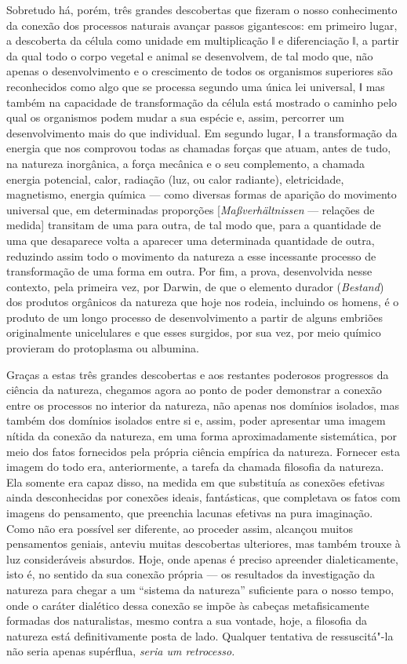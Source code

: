 Sobretudo há, porém, três grandes descobertas que fizeram o nosso
conhecimento da conexão dos processos naturais avançar passos
gigantescos: em primeiro lugar, a descoberta da célula como unidade em
multiplicação ǁ e diferenciação ǁ, a partir da qual todo o corpo vegetal
e animal se desenvolvem, de tal modo que, não apenas o desenvolvimento e
o crescimento de todos os organismos superiores são reconhecidos como
algo que se processa segundo uma única lei universal, ǁ mas também na
capacidade de transformação da célula está mostrado o caminho pelo qual
os organismos podem mudar a sua espécie e, assim, percorrer um
desenvolvimento mais do que individual. Em segundo lugar, ǁ a
transformação da energia que nos comprovou todas as chamadas forças que
atuam, antes de tudo, na natureza inorgânica, a força mecânica e o seu
complemento, a chamada energia potencial, calor, radiação (luz, ou calor
radiante), eletricidade, magnetismo, energia química --- como diversas
formas de aparição do movimento universal que, em determinadas
proporções {[}\emph{Maßverhältnissen} --- relações de medida{]} transitam
de uma para outra, de tal modo que, para a quantidade de uma que
desaparece volta a aparecer uma determinada quantidade de outra,
reduzindo assim todo o movimento da natureza a esse incessante processo
de transformação de uma forma em outra. Por fim, a prova, desenvolvida
nesse contexto, pela primeira vez,
por Darwin,
de que o elemento durador (\emph{Bestand}) dos produtos orgânicos da
natureza que hoje nos rodeia, incluindo os homens, é o produto de um
longo processo de desenvolvimento a partir de alguns embriões
originalmente unicelulares e que esses surgidos, por sua vez, por meio
químico provieram do protoplasma ou albumina.

Graças a estas três grandes descobertas e aos restantes poderosos
progressos da ciência da natureza, chegamos agora ao ponto de poder
demonstrar a conexão entre os processos no interior da natureza, não
apenas nos domínios isolados, mas também dos domínios isolados entre si
e, assim, poder apresentar uma imagem nítida da conexão da natureza, em
uma forma aproximadamente sistemática, por meio dos fatos fornecidos
pela própria ciência empírica da natureza. Fornecer esta imagem do todo
era, anteriormente, a tarefa da chamada filosofia da natureza. Ela
somente era capaz disso, na medida em que substituía as conexões
efetivas ainda desconhecidas por conexões ideais, fantásticas, que
completava os fatos com imagens do pensamento, que preenchia lacunas
efetivas na pura imaginação. Como não era possível ser diferente, ao
proceder assim, alcançou muitos pensamentos geniais, anteviu muitas
descobertas ulteriores, mas também trouxe à luz consideráveis absurdos.
Hoje, onde apenas é preciso apreender dialeticamente, isto é, no sentido
da sua conexão própria --- os resultados da investigação da natureza para
chegar a um ``sistema da natureza'' suficiente para o nosso tempo, onde
o caráter dialético dessa conexão se impõe às cabeças metafisicamente
formadas dos naturalistas, mesmo contra a sua vontade, hoje, a filosofia
da natureza está definitivamente posta de lado. Qualquer tentativa de
ressuscitá"-la não seria apenas supérflua, \emph{seria um retrocesso.}

